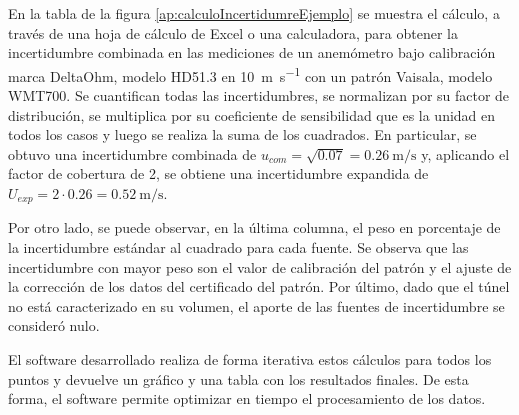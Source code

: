 En la tabla de la figura \ref{ap:calculoIncertidumreEjemplo} se muestra el cálculo, a través de una hoja de cálculo de Excel o una calculadora, para obtener la incertidumbre combinada en las mediciones de un anemómetro bajo calibración marca DeltaOhm, modelo HD51.3 en \SI{10}{\meter\per\second} con un patrón Vaisala, modelo WMT700. Se cuantifican todas las incertidumbres, se normalizan por su factor de distribución, se multiplica por su coeficiente de sensibilidad que es la unidad en todos los casos y luego se realiza la suma de los cuadrados. En particular, se obtuvo una incertidumbre combinada de $u_{com} = \sqrt{0.07} = \SI{0.26}{\meter\per\second}$ y, aplicando el factor de cobertura de 2, se obtiene una incertidumbre expandida de $U_{exp} = 2 \cdot 0.26 = \SI{0.52}{\meter\per\second}$.

Por otro lado, se puede observar, en la última columna, el peso en porcentaje de la incertidumbre estándar al cuadrado para cada fuente. Se observa que las incertidumbre con mayor peso son el valor de calibración del patrón y el ajuste de la corrección de los datos del certificado del patrón. Por último, dado que el túnel no está caracterizado en su volumen, el aporte de las fuentes de incertidumbre se consideró nulo.

El software desarrollado realiza de forma iterativa estos cálculos para todos los puntos y devuelve un gráfico y una tabla con los resultados finales. De esta forma, el software permite optimizar en tiempo el procesamiento de los datos.


\newpage
{}
